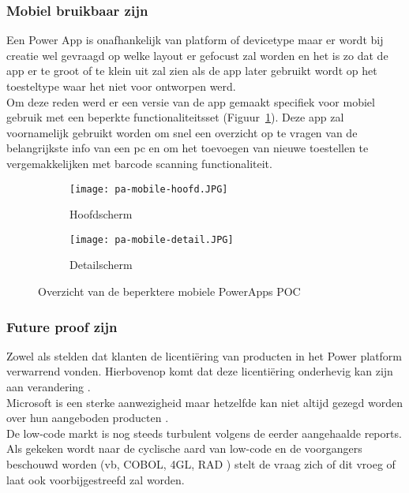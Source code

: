 \subsubsection{Mobiel bruikbaar zijn}

Een Power App is onafhankelijk van platform of devicetype maar er wordt bij creatie wel gevraagd op welke layout er gefocust zal worden en het is zo dat de app er te groot of te klein uit zal zien als de app later gebruikt wordt op het toesteltype waar het niet voor ontworpen werd.\\
Om deze reden werd er een versie van de app gemaakt specifiek voor mobiel gebruik met een beperkte functionaliteitsset (Figuur~\ref{fig:pa-mobile}). Deze app zal voornamelijk gebruikt worden om snel een overzicht op te vragen van de belangrijkste info van een pc en om het toevoegen van nieuwe toestellen te vergemakkelijken met barcode scanning functionaliteit.

\begin{figure}[h!]
    \centering
    \begin{subfigure}[b]{0.45\linewidth}
        \texttt{[image: pa-mobile-hoofd.JPG]}
        \caption{Hoofdscherm}
    \end{subfigure}
    \begin{subfigure}[b]{0.45\linewidth}
        \texttt{[image: pa-mobile-detail.JPG]}
        \caption{Detailscherm}
    \end{subfigure}
    \caption{Overzicht van de beperktere mobiele PowerApps POC}
    \label{fig:pa-mobile}
\end{figure}

\subsubsection{Future proof zijn}

Zowel \textcite{Rymer2019} als \textcite{Vincent2019} stelden dat klanten de licentiëring van producten in het Power platform verwarrend vonden. Hierbovenop komt dat deze licentiëring onderhevig kan zijn aan verandering \autocite{Pohl2019}.\\
Microsoft is een sterke aanwezigheid maar hetzelfde kan niet altijd gezegd worden over hun aangeboden producten \autocite{Bott2018}.\\
De low-code markt is nog steeds turbulent volgens de eerder aangehaalde reports.
Als gekeken wordt naar de cyclische aard van low-code en de voorgangers beschouwd worden (vb, COBOL, 4GL, RAD ) stelt de vraag zich of dit vroeg of laat ook voorbijgestreefd zal worden. \autocite{Reselman2018}

